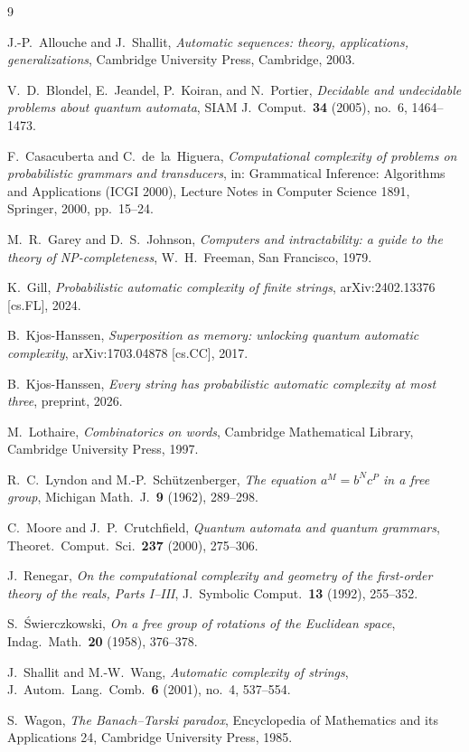 \documentclass[11pt]{amsart}
\theoremstyle{definition}
\theoremstyle{remark}
\begin{document}
\begin{thebibliography}{9}

J.-P.~Allouche and J.~Shallit,
\emph{Automatic sequences: theory, applications, generalizations},
Cambridge University Press, Cambridge, 2003.

V.~D.~Blondel, E.~Jeandel, P.~Koiran, and N.~Portier,
\emph{Decidable and undecidable problems about quantum automata},
SIAM J.\ Comput.\ \textbf{34} (2005), no.~6, 1464--1473.

F.~Casacuberta and C.~de~la~Higuera,
\emph{Computational complexity of problems on probabilistic grammars
and transducers}, in: Grammatical Inference: Algorithms and
Applications (ICGI 2000), Lecture Notes in Computer Science 1891,
Springer, 2000, pp.~15--24.

M.~R.~Garey and D.~S.~Johnson,
\emph{Computers and intractability: a guide to the theory of
NP-completeness}, W.~H.~Freeman, San Francisco, 1979.

K.~Gill,
\emph{Probabilistic automatic complexity of finite strings},
arXiv:2402.13376 [cs.FL], 2024.

B.~Kjos-Hanssen,
\emph{Superposition as memory: unlocking quantum automatic complexity},
arXiv:1703.04878 [cs.CC], 2017.

B.~Kjos-Hanssen,
\emph{Every string has probabilistic automatic complexity at most
three}, preprint, 2026.

M.~Lothaire,
\emph{Combinatorics on words},
Cambridge Mathematical Library, Cambridge University Press, 1997.

R.~C.~Lyndon and M.-P.~Sch\"utzenberger,
\emph{The equation $a^M=b^Nc^P$ in a free group},
Michigan Math.\ J.\ \textbf{9} (1962), 289--298.

C.~Moore and J.~P.~Crutchfield,
\emph{Quantum automata and quantum grammars},
Theoret.\ Comput.\ Sci.\ \textbf{237} (2000), 275--306.

J.~Renegar,
\emph{On the computational complexity and geometry of the first-order
theory of the reals, Parts I--III},
J.\ Symbolic Comput.\ \textbf{13} (1992), 255--352.

S.~\'Swierczkowski,
\emph{On a free group of rotations of the Euclidean space},
Indag.\ Math.\ \textbf{20} (1958), 376--378.

J.~Shallit and M.-W.~Wang,
\emph{Automatic complexity of strings},
J.\ Autom.\ Lang.\ Comb.\ \textbf{6} (2001), no.~4, 537--554.

S.~Wagon,
\emph{The Banach--Tarski paradox},
Encyclopedia of Mathematics and its Applications 24, Cambridge
University Press, 1985.

\end{thebibliography}
\end{document}
